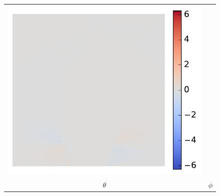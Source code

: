 \documentclass[11pt]{article}
\begin{document}
\begin{figure}[!h]
\begin{tabular}{cc}
         \includegraphics[scale=.5]{img/splitFluxRobust/phi.pdf}
         \\
         $\theta $ & $\phi$ 
    \end{tabular}
\end{figure}
\pagebreak
\end{document}
